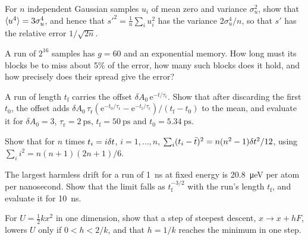 \begin{exercise}
\label{ex:cv-error-error}
For $n$ independent Gaussian samples $u_i$ of mean zero and variance
$\sigma_u^2$, show that $\langle u^4 \rangle = 3\sigma_u^4$, and hence that $s'^2 =
\frac1n\sum_iu_i^2$ has the variance $2\sigma_u^4/n$, so that $s'$ has the
relative error $1/\sqrt{2n}$.
\end{exercise}

\begin{exercise}
\label{ex:cv-block-length}
A run of $2^{16}$ samples has $g = 60$ and an exponential memory. How long
must its blocks be to miss about 5\% of the error, how many such blocks does it hold, and how
precisely does their spread give the error?
\end{exercise}

\begin{exercise}
\label{ex:cv-offset}
A run of length $t_{\mathrm f}$ carries the offset $\delta A_0\,\mathrm{e}^{-t/\tau_{\mathrm
r}}$. Show that after discarding the first $t_0$, the offset adds
$\delta A_0\,\tau_{\mathrm r}(\mathrm{e}^{-t_0/\tau_{\mathrm r}} -
\mathrm{e}^{-t_{\mathrm f}/\tau_{\mathrm r}})/(t_{\mathrm f} - t_0)$ to the mean, and evaluate it for
$\delta A_0 = 3$, $\tau_{\mathrm r} = \SI{2}{\pico\second}$, $t_{\mathrm f} =
\SI{50}{\pico\second}$ and $t_0 = \SI{5.34}{\pico\second}$.
\end{exercise}

\begin{exercise}
\label{ex:cv-stt}
Show that for $n$ times $t_i = i\delta t$, $i = 1, \dots, n$,
$\sum_i(t_i - \bar t)^2 = n(n^2 - 1)\delta t^2/12$, using $\sum_ii^2 = n(n +
1)(2n + 1)/6$.
\end{exercise}

\begin{exercise}
\label{ex:cv-drift-limit}
The largest harmless drift for a run of \SI{1}{\nano\second} at fixed
energy is \SI{20.8}{\micro\electronvolt} per atom per nanosecond. Show
that the limit falls as $t_{\mathrm f}^{-3/2}$ with the run's length $t_{\mathrm f}$, and evaluate it
for \SI{10}{\nano\second}.
\end{exercise}

\begin{exercise}
\label{ex:cv-steepest}
For $U = \frac12kx^2$ in one dimension, show that a step of steepest
descent, $x \to x + hF$, lowers $U$ only if $0 < h < 2/k$, and that $h =
1/k$ reaches the minimum in one step.
\end{exercise}


